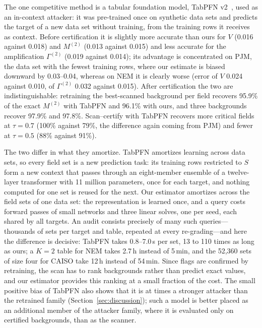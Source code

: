 The one competitive method is a tabular foundation model, TabPFN v2~\cite{hollmann2025tabpfn}, used as an in-context
attacker: it was pre-trained once on synthetic data sets and predicts the target of a new data set without training, from the
training rows it receives as context. Before certification it is slightly more accurate than ours for $V$ (0.016 against
0.018) and $M^{(2)}$ (0.013 against 0.015) and less accurate for the amplification $\Gamma^{(2)}$ (0.019 against 0.014); its
advantage is concentrated on PJM, the data set with the fewest training rows, where our estimate is biased downward by
0.03--0.04, whereas on NEM it is clearly worse (error of $V$ 0.024 against 0.010, of $\Gamma^{(2)}$ 0.032 against 0.015). After
certification the two are indistinguishable: retraining the best-scanned background per field recovers 95.9\% of the exact
$M^{(2)}$ with TabPFN and 96.1\% with ours, and three backgrounds recover 97.9\% and 97.8\%. Scan--certify with TabPFN recovers
more critical fields at $\tau=0.7$ (100\% against 79\%, the difference again coming from PJM) and fewer at $\tau=0.5$ (88\%
against 91\%).

The two differ in what they amortize. TabPFN amortizes learning across data sets, so every field set is a new prediction
task: its training rows restricted to $S$ form a new context that passes through an eight-member ensemble of a twelve-layer
transformer with 11 million parameters, once for each target, and nothing computed for one set is reused for the next. Our estimator amortizes across the field sets of one
data set: the representation is learned once, and a query costs forward passes of small networks and three linear solves,
one per seed, each shared by all targets. An audit consists precisely of many such queries---thousands of sets per target and table, repeated at
every re-grading---and here the difference is decisive: TabPFN takes 0.8--7.0\,s per set, 13 to 110 times as long as ours; a
$K=2$ table for NEM takes 2.7\,h instead of 5\,min, and the 52,360 sets of size four for CAISO take 12\,h instead of 54\,min.
Since flags are confirmed by retraining, the scan has to rank backgrounds rather than predict exact values, and our estimator
provides this ranking at a small fraction of the cost. The small positive bias of TabPFN also shows that it is at times a
stronger attacker than the retrained family (Section~\ref{sec:discussion}); such a model is better placed as an additional
member of the attacker family, where it is evaluated only on certified backgrounds, than as the scanner.

